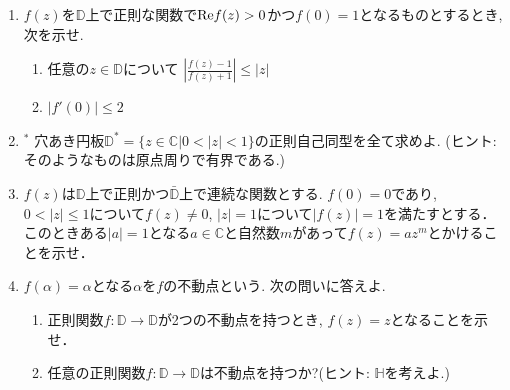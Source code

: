 \documentclass[dvipdfmx,a4paper,11pt]{article}
\newcommand{\C}{\mathbb{C}}
\newcommand{\D}{\mathbb{D}}
\theoremstyle{definition}
\begin{document}
\begin{enumerate}[label=\textbf{問}7.\arabic*]
    \item $f(z)$を$\D$上で正則な関数で${\rm Re}f(z) >0$かつ$f(0)=1$となるものとするとき, 次を示せ.
     \begin{enumerate}
\setlength{\parskip}{0cm} 
  \setlength{\itemsep}{0cm} 
  \item 任意の$z \in \D$について $ \left|\frac{f(z) -1}{f(z)+1} \right| \le |z|$
    \item $ \left|f'(0) \right| \le 2$
  \end{enumerate} 
  


\item  $^{*}$ 穴あき円板$\D^{*}=\{z \in \C | 0< |z| <1 \}$の正則自己同型を全て求めよ.  (ヒント: そのようなものは原点周りで有界である.)

  

  \item $f(z)$は$\D$上で正則かつ$\bar{\D}$上で連続な関数とする. $f(0)=0$であり, $0 < |z| \le 1$について$f(z) \neq 0$, $|z|=1$について$|f(z)|=1$を満たすとする． このときある$|a|=1$となる$a \in \C$と自然数$m$があって$f(z)=az^m$とかけることを示せ．
  
  \item $f(\alpha)=\alpha$となる$\alpha$を$f$の不動点という. 次の問いに答えよ.
   \begin{enumerate}
\setlength{\parskip}{0cm} 
  \setlength{\itemsep}{0cm} 
 \item 正則関数$f : \D \to \D$が2つの不動点を持つとき, $f(z)=z$となることを示せ．
 \item 任意の正則関数$f : \D \to \D$は不動点を持つか?(ヒント: $\mathbb{H}$を考えよ.)
      \end{enumerate} 
      

\end{enumerate}
\end{document}
